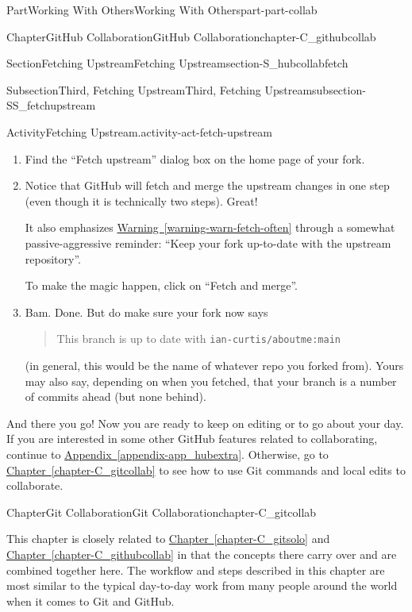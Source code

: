 \documentclass[oneside,10pt,]{book}
\newcommand{\xreffont}{\relax}
\newcommand{\mono}[1]{\texttt{#1}}
\begin{document}
\begin{partptx}{Part}{Working With Others}{}{Working With Others}{}{}{part-part-collab}
\begin{chapterptx}{Chapter}{GitHub Collaboration}{}{GitHub Collaboration}{}{}{chapter-C_githubcollab}
\begin{sectionptx}{Section}{Fetching Upstream}{}{Fetching Upstream}{}{}{section-S_hubcollabfetch}
\begin{subsectionptx}{Subsection}{Third, Fetching Upstream}{}{Third, Fetching Upstream}{}{}{subsection-SS_fetchupstream}
\begin{activity}{Activity}{Fetching Upstream.}{activity-act-fetch-upstream}
\begin{enumerate}[font=\bfseries,label=(\alph*),ref=\alph*]
\item{}Find the ``Fetch upstream'' dialog box on the home page of your fork.%
\item{}Notice that GitHub will fetch and merge the upstream changes in one step (even though it is technically two steps). Great!%
\par
It also emphasizes \hyperref[warning-warn-fetch-often]{Warning~{\xreffont\ref{warning-warn-fetch-often}}} through a somewhat passive-aggressive reminder: ``Keep your fork up-to-date with the upstream repository''.%
\par
To make the magic happen, click on ``Fetch and merge''.%
\item{}Bam. Done. But do make sure your fork now says%
\begin{quote}%
This branch is up to date with \mono{ian-curtis/aboutme:main}%
\end{quote}
(in general, this would be the name of whatever repo you forked from). Yours may also say, depending on when you fetched, that your branch is a number of commits ahead (but none behind).%
\end{enumerate}%
\end{activity}%
\end{subsectionptx}
\begin{conclusion}{}%
And there you go! Now you are ready to keep on editing or to go about your day. If you are interested in some other GitHub features related to collaborating, continue to \hyperref[appendix-app_hubextra]{Appendix~{\xreffont\ref{appendix-app_hubextra}}}. Otherwise, go to \hyperref[chapter-C_gitcollab]{Chapter~{\xreffont\ref{chapter-C_gitcollab}}} to see how to use Git commands and local edits to collaborate.%
\end{conclusion}%
\end{sectionptx}
\end{chapterptx}
%
\typeout{************************************************}
\typeout{************************************************}
%
\begin{chapterptx}{Chapter}{Git Collaboration}{}{Git Collaboration}{}{}{chapter-C_gitcollab}
\renewcommand*{\chaptername}{Chapter}
\begin{introduction}{}%
This chapter is closely related to \hyperref[chapter-C_gitsolo]{Chapter~{\xreffont\ref{chapter-C_gitsolo}}} and \hyperref[chapter-C_githubcollab]{Chapter~{\xreffont\ref{chapter-C_githubcollab}}} in that the concepts there carry over and are combined together here. The workflow and steps described in this chapter are most similar to the typical day-to-day work from many people around the world when it comes to Git and GitHub.%

\end{introduction}
\end{chapterptx}
\end{partptx}
\end{document}
